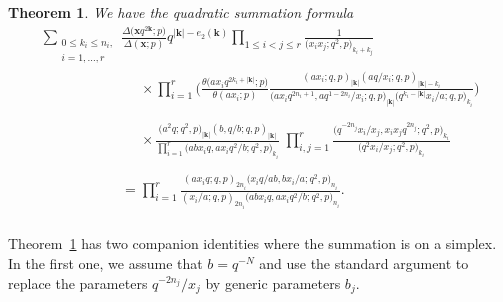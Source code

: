 \documentclass[pdftex]{sigma}%
\numberwithin{equation}{section}
\newtheorem{Theorem}{Theorem}[section]
\def\ta{\theta}
\newcommand\bk{\mathbf k}
\newcommand\bx{\mathbf x}
\begin{document}
\begin{Theorem}\label{dqst}
We have the quadratic summation formula
\begin{gather*}
\sum_{\substack{0\leq k_i\leq n_i,\\ i=1,\dots,r}}
\frac{\Delta\big(\bx q^{2\bk};p\big)}{\Delta(\bx;p)}
q^{|\bk|-e_2(\bk)}
\prod\limits_{1\le i<j\le r}\frac 1{\big(x_ix_j;q^2,p\big) _{k_i+k_j}}
\\ \phantom{\sum_{\substack{0\leq k_i\leq n_i,\\ i=1,\dots,r}}=}
\times\prod\limits_{i=1}^{r}\bigg(\frac{\ta\big(ax_iq^{2k_i+|\bk|};p\big)}{\ta(ax_i;p)}
\frac {(ax_i;q,p)_{|\bk|} (aq/x_i;q,p)_{|\bk|-k_i}}
{\big(ax_iq^{2n_i+1},aq^{1-2n_i}/x_i;q,p\big)_{|\bk|}\big(q^{k_i-|\bk|}x_i/a;q,p\big)_{k_i}}\bigg)
\\ \phantom{\sum_{\substack{0\leq k_i\leq n_i,\\ i=1,\dots,r}}=}{}
\times\frac{\big(a^2q;q^2,p\big)_{|\bk|} (b,q/b;q,p)_{|\bk|}}
{\prod\limits_{i=1}^{r}\big(abx_iq,ax_iq^2/b;q^2,p\big)_{k_i}}\;
\prod\limits_{i,j=1} ^{r}\frac{\big(q^{-2n_j}x_i/x_j,x_ix_jq^{2n_j};q^2,p\big)_{k_i}}
{\big(q^2x_i/x_j;q^2,p\big)_{k_i}}
\\ \phantom{\sum_{\substack{0\leq k_i\leq n_i,\\ i=1,\dots,r}}}{}
=\prod\limits_{i=1} ^{r}\frac{(ax_iq;q,p)_{2n_i} \big(x_iq/ab,bx_i/a;q^2,p\big)_{n_i}}
{(x_i/a;q,p)_{2n_i}\big(abx_iq,ax_iq^2/b;q^2,p\big)_{n_i}}.
\end{gather*}
\end{Theorem}

Theorem~\ref{dqst} has two companion identities where the summation is on a simplex. In the first one, we assume that $b=q^{-N}$ and use the standard argument
to replace the parameters $q^{-2n_j}/x_j$ by generic parameters $b_j$.
\end{document}
